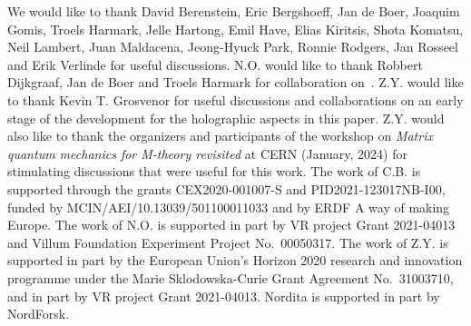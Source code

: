 \documentclass[11pt]{article}
\renewcommand{\emph}[1]{\textit{#1}}
\begin{document}
We would like to thank David Berenstein, Eric Bergshoeff, Jan de Boer, Joaquim Gomis, Troels Harmark, Jelle Hartong, Emil Have, Elias Kiritsis, Shota Komatsu, Neil Lambert, Juan Maldacena, Jeong-Hyuck Park, Ronnie Rodgers, Jan Rosseel and Erik Verlinde for useful discussions. N.O. would like to thank Robbert Dijkgraaf, Jan de Boer and Troels Harmark for collaboration on~\cite{bpslimits}. 
Z.Y. would like to thank Kevin T. Grosvenor for useful discussions and collaborations on an early stage of the development for the holographic aspects in this paper. Z.Y. would also like to thank the organizers and participants of the workshop on \emph{Matrix quantum mechanics for M-theory revisited} at CERN (January, 2024) for stimulating discussions that were useful for this work. 
The work of C.B. is supported through the grants CEX2020-001007-S and PID2021-123017NB-I00, funded by MCIN/AEI/10.13039/501100011033 and by ERDF A way of making Europe. 
The work of N.O. is supported in part by VR project Grant 2021-04013 and Villum Foundation Experiment Project No.~00050317. 
The work of Z.Y. is supported in part by the European Union’s Horizon 2020 research and innovation programme under the Marie Sklodowska-Curie Grant Agreement No.~31003710, and in part by VR project Grant 2021-04013. Nordita is supported in part by NordForsk.  
\end{document}
